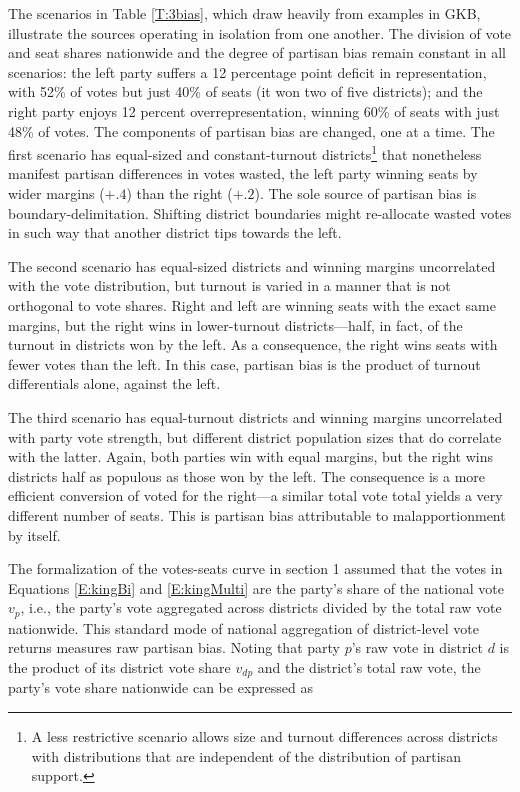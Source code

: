\documentclass[letter,12pt]{article}
\begin{document}
The scenarios in Table \ref{T:3bias}, which draw heavily from examples in GKB, illustrate the sources operating in isolation from one another. The division of vote and seat shares nationwide and the degree of partisan bias remain constant in all scenarios: the left party suffers a 12 percentage point deficit in representation, with 52\% of votes but just 40\% of seats (it won two of five districts); and the right party enjoys 12 percent overrepresentation, winning 60\% of seats with just 48\% of votes. The components of partisan bias are changed, one at a time. The first scenario has equal-sized and constant-turnout districts\footnote{A less restrictive scenario allows size and turnout differences across districts with distributions that are independent of the distribution of partisan support.} that nonetheless manifest partisan differences in votes wasted, the left party winning seats by wider margins ($+.4$) than the right ($+.2$). The sole source of partisan bias is boundary-delimitation. Shifting district boundaries might re-allocate wasted votes in such way that another district tips towards the left. 

The second scenario has equal-sized districts and winning margins uncorrelated with the vote distribution, but turnout is varied in a manner that is not orthogonal to vote shares. Right and left are winning seats with the exact same margins, but the right wins in lower-turnout districts---half, in fact, of the turnout in districts won by the left. As a consequence, the right wins seats with fewer votes than the left. In this case, partisan bias is the product of turnout differentials alone, against the left. 

The third scenario has equal-turnout districts and winning margins uncorrelated with party vote strength, but different district population sizes that do correlate with the latter. Again, both parties win with equal margins, but the right wins districts half as populous as those won by the left. The consequence is a more efficient conversion of voted for the right---a similar total vote total yields a very different number of seats. This is partisan bias attributable to malapportionment by itself.

The formalization of the votes-seats curve in section 1 assumed that the votes in Equations \ref{E:kingBi} and \ref{E:kingMulti} are the party's share of the national vote $v_p$, i.e., the party's vote aggregated across districts divided by the total raw vote nationwide. This standard mode of national aggregation of district-level vote returns measures raw partisan bias. Noting that party $p$'s raw vote in district $d$ is the product of its district vote share $v_{dp}$ and the district's total raw vote, the party's vote share nationwide can be expressed as 
\end{document}
